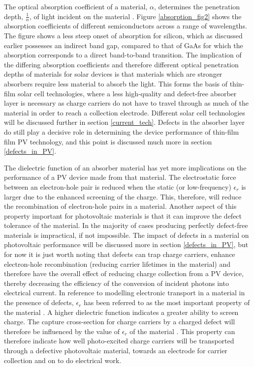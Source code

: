 The optical absorption coefficient of a material, $\alpha$, determines the penetration depth, $\frac{1}{\alpha}$, of light incident on the material \cite{absorption_coeff_book1}. Figure \ref{absorption_fig2} shows the absorption coefficients of different semiconductors across a range of wavelengths. The figure shows a less steep onset of absorption for silicon, which as discussed earlier possesses an indirect band gap, compared to that of GaAs for which the absorption corresponds to a direct band-to-band transition. The implication of the differing absorption coefficients and therefore different optical penetration depths of materials for solar devices is that materials which are stronger absorbers require less material to absorb the light. This forms the basis of thin-film solar cell technologies, where a less high-quality and defect-free absorber layer is necessary as charge carriers do not have to travel through as much of the material in order to reach a collection electrode. Different solar cell technologies will be discussed further in section \ref{current_tech}. Defects in the absorber layer do still play a decisive role in determining the device performance of thin-film film PV technology, and this point is discussed much more in section \ref{defects_in_PV}.

The dielectric function of an absorber material has yet more implications on the performance of a PV device made from that material. The electrostatic force between an electron-hole pair is reduced when the static (or low-frequency) $\epsilon_r$ is larger \cite{dielectric_const1} due to the enhanced screening of the charge. This, therefore, will reduce the recombination of electron-hole pairs in a material. Another aspect of this property important for photovoltaic materials is that it can improve the defect tolerance of the material. In the majority of cases producing perfectly defect-free materials is impractical, if not impossible. The impact of defects in a material on photovoltaic performance will be discussed more in section \ref{defects_in_PV}, but for now it is just worth noting that defects can trap charge carriers, enhance electron-hole recombination (reducing carrier lifetimes in the material) and therefore have the overall effect of reducing charge collection from a PV device, thereby decreasing the efficiency of the conversion of incident photons into electrical current.
In reference to modelling electronic transport in a material in the presence of defects, $\epsilon_r$ has been referred to as the most important property of the material \cite{defect_tolerance}. A higher dielectric function indicates a greater ability to screen charge. The capture cross-section for charge carriers by a charged defect will therefore be influenced by the value of $\epsilon_r$ of the material \cite{defect_tolerance}. This property can therefore indicate how well photo-excited charge carriers will be transported through a defective photovoltaic material, towards an electrode for carrier collection and on to do electrical work.


